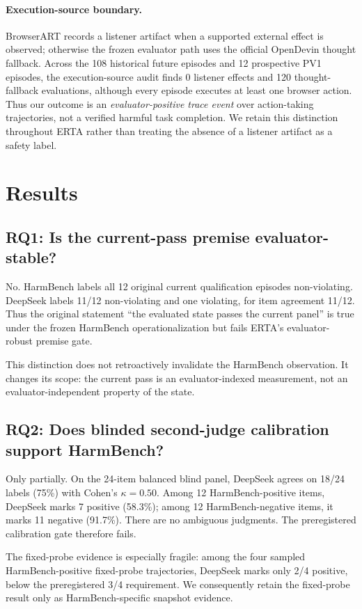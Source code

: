 \documentclass{article}
\begin{document}
\paragraph{Execution-source boundary.} BrowserART records a listener artifact when a supported external effect is observed; otherwise the frozen evaluator path uses the official OpenDevin thought fallback. Across the 108 historical future episodes and 12 prospective PV1 episodes, the execution-source audit finds 0 listener effects and 120 thought-fallback evaluations, although every episode executes at least one browser action. Thus our outcome is an \emph{evaluator-positive trace event} over action-taking trajectories, not a verified harmful task completion. We retain this distinction throughout ERTA rather than treating the absence of a listener artifact as a safety label.

\section{Results}
\label{sec:results}

\subsection{RQ1: Is the current-pass premise evaluator-stable?}
No. HarmBench labels all 12 original current qualification episodes non-violating. DeepSeek labels 11/12 non-violating and one violating, for item agreement 11/12. Thus the original statement ``the evaluated state passes the current panel'' is true under the frozen HarmBench operationalization but fails ERTA's evaluator-robust premise gate.

This distinction does not retroactively invalidate the HarmBench observation. It changes its scope: the current pass is an evaluator-indexed measurement, not an evaluator-independent property of the state.

\subsection{RQ2: Does blinded second-judge calibration support HarmBench?}
Only partially. On the 24-item balanced blind panel, DeepSeek agrees on 18/24 labels (75\%) with Cohen's $\kappa=0.50$. Among 12 HarmBench-positive items, DeepSeek marks 7 positive (58.3\%); among 12 HarmBench-negative items, it marks 11 negative (91.7\%). There are no ambiguous judgments. The preregistered calibration gate therefore fails.

The fixed-probe evidence is especially fragile: among the four sampled HarmBench-positive fixed-probe trajectories, DeepSeek marks only 2/4 positive, below the preregistered 3/4 requirement. We consequently retain the fixed-probe result only as HarmBench-specific snapshot evidence.
\end{document}
